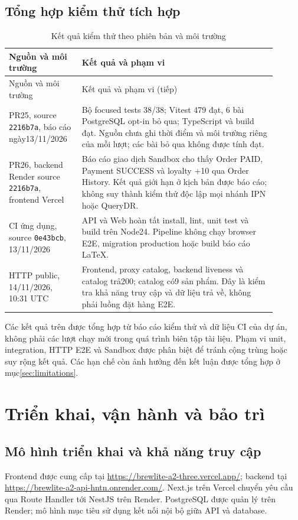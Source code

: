 \subsection{Tổng hợp kiểm thử tích hợp}
\begin{longtable}{>{\raggedright\arraybackslash}p{0.24\linewidth}p{0.66\linewidth}}
\caption{Kết quả kiểm thử theo phiên bản và môi trường}\label{tab:test-results}\\
\toprule Nguồn và môi trường & Kết quả và phạm vi \\ \midrule\endfirsthead
\toprule Nguồn và môi trường & Kết quả và phạm vi (tiếp) \\ \midrule\endhead
PR25, source \texttt{2216b7a}, báo cáo ngày13/11/2026 & Bộ focused tests 38/38; Vitest 479 đạt, 6 bài PostgreSQL opt-in bỏ qua; TypeScript và build đạt. Nguồn chưa ghi thời điểm và môi trường riêng của mỗi lượt; các bài bỏ qua không được tính đạt. \\
PR26, backend Render source \texttt{2216b7a}, frontend Vercel & Báo cáo giao dịch Sandbox cho thấy Order PAID, Payment SUCCESS và loyalty +10 qua Order History. Kết quả giới hạn ở kịch bản được báo cáo; không suy thành kiểm thử độc lập mọi nhánh IPN hoặc QueryDR. \\
CI ứng dụng, source \texttt{0e43bcb}, 13/11/2026 & API và Web hoàn tất install, lint, unit test và build trên Node24. Pipeline không chạy browser E2E, migration production hoặc build báo cáo LaTeX. \\
HTTP public, 14/11/2026, 10:31 UTC & Frontend, proxy catalog, backend liveness và catalog trả200; catalog có9 sản phẩm. Đây là kiểm tra khả năng truy cập và dữ liệu trả về, không phải luồng đặt hàng E2E. \\
\bottomrule\end{longtable}

Các kết quả trên được tổng hợp từ báo cáo kiểm thử và dữ liệu CI của dự án,
không phải các lượt chạy mới trong quá trình biên tập tài liệu. Phạm vi unit,
integration, HTTP E2E và Sandbox được phân biệt để tránh cộng trùng hoặc suy
rộng kết quả. Các hạn chế còn ảnh hưởng đến kết luận được tổng hợp ở
mục\ref{sec:limitations}.

\section{Triển khai, vận hành và bảo trì}
\label{sec:deployment-release-delivery}
\subsection{Mô hình triển khai và khả năng truy cập}
Frontend được cung cấp tại \url{https://brewlite-a2-three.vercel.app/}; backend
tại \url{https://brewlite-a2-api-hntn.onrender.com/}. Next.js trên Vercel chuyển
yêu cầu qua Route Handler tới NestJS trên Render. PostgreSQL được quản lý
trên Render; mô hình mục tiêu sử dụng kết nối nội bộ giữa API và database.

